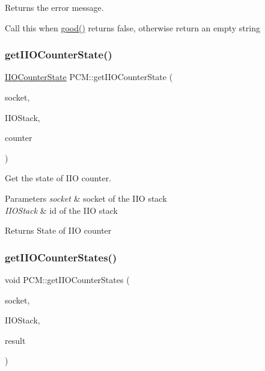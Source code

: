 Returns the error message. 

Call this when \mbox{\hyperlink{class_p_c_m_a56eedaa84893f72b1723f8d580ee3329}{good()}} returns false, otherwise return an empty string \mbox{\label{class_p_c_m_a85e2036c24c34ab5eecce856382d19fb}} 
\subsubsection{\texorpdfstring{get\+I\+I\+O\+Counter\+State()}{getIIOCounterState()}}
{\footnotesize\ttfamily \mbox{\hyperlink{class_simple_counter_state}{I\+I\+O\+Counter\+State}} P\+C\+M\+::get\+I\+I\+O\+Counter\+State (\begin{DoxyParamCaption}\item[{int}]{socket,  }\item[{int}]{I\+I\+O\+Stack,  }\item[{int}]{counter }\end{DoxyParamCaption})}



Get the state of I\+IO counter. 


\begin{DoxyParams}{Parameters}
{\em socket} & socket of the I\+IO stack \\
\hline
{\em I\+I\+O\+Stack} & id of the I\+IO stack \\
\hline
\end{DoxyParams}
\begin{DoxyReturn}{Returns}
State of I\+IO counter 
\end{DoxyReturn}
\mbox{\label{class_p_c_m_a25e8b223197728858a704d53b8ab5534}} 
\subsubsection{\texorpdfstring{get\+I\+I\+O\+Counter\+States()}{getIIOCounterStates()}}
{\footnotesize\ttfamily void P\+C\+M\+::get\+I\+I\+O\+Counter\+States (\begin{DoxyParamCaption}\item[{int}]{socket,  }\item[{int}]{I\+I\+O\+Stack,  }\item[{\mbox{\hyperlink{class_simple_counter_state}{I\+I\+O\+Counter\+State}} $\ast$}]{result }\end{DoxyParamCaption})}



